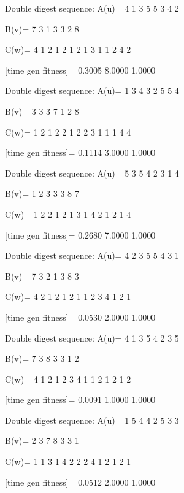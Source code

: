 Double digest sequence:
A(u)=
     4     1     3     5     5     3     4     2

B(v)=
     7     3     1     3     3     2     8

C(w)=
     4     1     2     1     2     1     2     1     3     1     1     2     4     2

[time gen fitness]=
    0.3005    8.0000    1.0000

Double digest sequence:
A(u)=
     1     3     4     3     2     5     5     4

B(v)=
     3     3     3     7     1     2     8

C(w)=
     1     2     1     2     2     1     2     2     3     1     1     1     4     4

[time gen fitness]=
    0.1114    3.0000    1.0000

Double digest sequence:
A(u)=
     5     3     5     4     2     3     1     4

B(v)=
     1     2     3     3     3     8     7

C(w)=
     1     2     2     1     2     1     3     1     4     2     1     2     1     4

[time gen fitness]=
    0.2680    7.0000    1.0000

Double digest sequence:
A(u)=
     4     2     3     5     5     4     3     1

B(v)=
     7     3     2     1     3     8     3

C(w)=
     4     2     1     2     1     2     1     1     2     3     4     1     2     1

[time gen fitness]=
    0.0530    2.0000    1.0000

Double digest sequence:
A(u)=
     4     1     3     5     4     2     3     5

B(v)=
     7     3     8     3     3     1     2

C(w)=
     4     1     2     1     2     3     4     1     1     2     1     2     1     2

[time gen fitness]=
    0.0091    1.0000    1.0000

Double digest sequence:
A(u)=
     1     5     4     4     2     5     3     3

B(v)=
     2     3     7     8     3     3     1

C(w)=
     1     1     3     1     4     2     2     2     4     1     2     1     2     1

[time gen fitness]=
    0.0512    2.0000    1.0000

